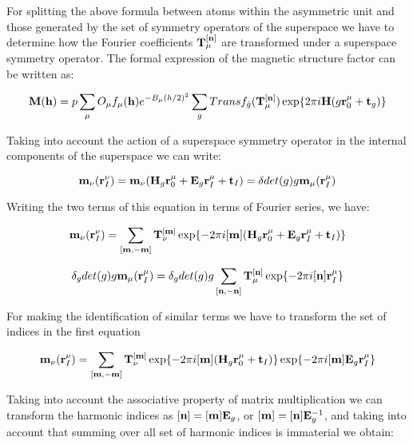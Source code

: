 \documentclass[10pt]{article}
\begin{document}
For splitting the above formula between atoms within the asymmetric unit and those generated by the set of symmetry operators of the superspace we have to determine how the Fourier coefficients ${\bf T}_{\mu}^{[{\bf n}]}$ are transformed under a superspace symmetry operator. The formal expression of the magnetic structure factor can be written as:

\begin{equation} \label{magstrf_1}
{\bf M}({\bf h})=p\sum_{{\mu}} O_{\mu} f_{\mu}({\bf h}) e^{-B_\mu (h/2)^2 } \sum_g Transf_{\hat g}({\bf T}_{\mu}^{[{\bf n}]}) \exp\{2\pi i {\bf H}(g{\bf r}_0^\mu+{\bf t}_g) \}    
\end{equation}
 
Taking into account the action of a superspace symmetry operator in the internal components of the superspace we can write:

\begin{equation} \label{symmod_a}
{\bf m}_\nu({\bf r}_I^{\nu}) =  {\bf m}_\nu({\bf H}_g{\bf r}_0^\mu + {\bf E}_g{\bf r}_I^\mu + {\bf t}_I)= \delta det(g) g{\bf m}_{\mu}({\bf r}_I^{\mu}) 
\end{equation}

Writing the two terms of this equation in terms of Fourier series, we have:

\begin{equation} 
{\bf m}_\nu({\bf r}_I^{\nu})=\sum\limits_{[{\bf m},-{\bf m}]}  {\bf T}_{\nu}^{[{\bf m}]} \exp\{-2\pi i[{\bf m}] ({\bf H}_g{\bf r}_0^\mu + {\bf E}_g{\bf r}_I^\mu + {\bf t}_I)\} 
\end{equation}

\begin{equation} 
\delta_g det(g) g{\bf m}_{\mu}({\bf r}_I^{\mu}) =\delta_g det(g) g\sum\limits_{[{\bf n},-{\bf n}]}  {\bf T}_{\mu}^{[{\bf n}]} \exp\{-2\pi i[{\bf n}]{\bf r}_I^\mu \} 
\end{equation}

For making the identification of similar terms we have to transform the set of indices in the first equation

\begin{equation}  
{\bf m}_\nu({\bf r}_I^{\nu})=\sum\limits_{[{\bf m},-{\bf m}]}  {\bf T}_{\nu}^{[{\bf m}]} \exp\{-2\pi i[{\bf m}] ({\bf H}_g{\bf r}_0^\mu+ {\bf t}_I)\} \exp\{-2\pi i[{\bf m}] {\bf E}_g{\bf r}_I^\mu\}  
\end{equation}

Taking into account the associative property of matrix multiplication we can transform the harmonic indices as $[{\bf n}]=[{\bf m}] {\bf E}_g $, or $[{\bf m}]=[{\bf n}] {\bf E}_g^{-1} $, and taking into account that summing over all set of harmonic indices is immaterial we obtain:
\end{document}
